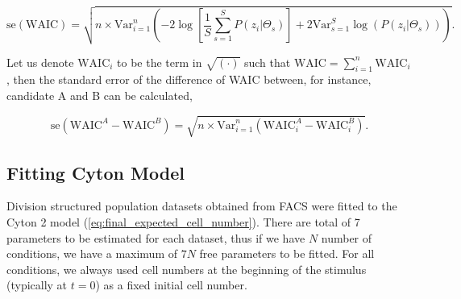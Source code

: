 \documentclass[11pt, a4paper]{article}
\begin{document}
\begin{linenomath*}
    \begin{equation}
        \mathrm{se}(\mathrm{WAIC}) =\sqrt{n \times \mathrm{Var}_{i=1}^n \left( -2\log\left[\frac{1}{S} \sum_{s=1}^S P(z_i|\Theta_s)\right] + 2\mathrm{Var}_{s=1}^S \log(P(z_i|\Theta_s)) \right)}.
    \end{equation}
\end{linenomath*}
Let us denote $\mathrm{WAIC}_i$ to be the term in $\sqrt{(\cdot)}$ such that $\mathrm{WAIC} = \sum_{i=1}^n \mathrm{WAIC}_i$, then the standard error of the difference of WAIC between, for instance, candidate A and B can be calculated,
\begin{linenomath*}
    \begin{equation*}
        \mathrm{se}(\mathrm{WAIC}^A - \mathrm{WAIC}^B) =\sqrt{n \times \mathrm{Var}_{i=1}^n \left(\mathrm{WAIC}_i^A - \mathrm{WAIC}_i^B \right)}.
    \end{equation*}
\end{linenomath*}

\nolinenumbers
\subsection{Fitting Cyton Model}
\linenumbers
Division structured population datasets obtained from FACS were fitted to the Cyton 2 model (\cref{eq:final_expected_cell_number}). There are total of 7 parameters to be estimated for each dataset, thus if we have $N$ number of conditions, we have a maximum of $7N$ free parameters to be fitted. For all conditions, we always used cell numbers at the beginning of the stimulus (typically at $t=0$) as a fixed initial cell number.
\end{document}
